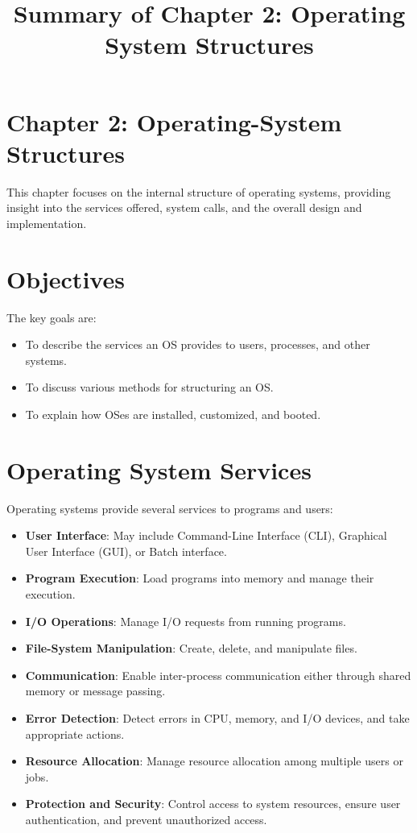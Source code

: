 \documentclass{article}
\title{Summary of Chapter 2: Operating System Structures}
\author{}
\date{}
\begin{document}
\maketitle

\section{Chapter 2: Operating-System Structures}
This chapter focuses on the internal structure of operating systems, providing insight into the services offered, system calls, and the overall design and implementation.

\section{Objectives}
The key goals are:
\begin{itemize}
    \item To describe the services an OS provides to users, processes, and other systems.
    \item To discuss various methods for structuring an OS.
    \item To explain how OSes are installed, customized, and booted.
\end{itemize}

\section{Operating System Services}
Operating systems provide several services to programs and users:
\begin{itemize}
    \item \textbf{User Interface}: May include Command-Line Interface (CLI), Graphical User Interface (GUI), or Batch interface.
    \item \textbf{Program Execution}: Load programs into memory and manage their execution.
    \item \textbf{I/O Operations}: Manage I/O requests from running programs.
    \item \textbf{File-System Manipulation}: Create, delete, and manipulate files.
    \item \textbf{Communication}: Enable inter-process communication either through shared memory or message passing.
    \item \textbf{Error Detection}: Detect errors in CPU, memory, and I/O devices, and take appropriate actions.
    \item \textbf{Resource Allocation}: Manage resource allocation among multiple users or jobs.
    \item \textbf{Protection and Security}: Control access to system resources, ensure user authentication, and prevent unauthorized access.
\end{itemize}
\end{document}
